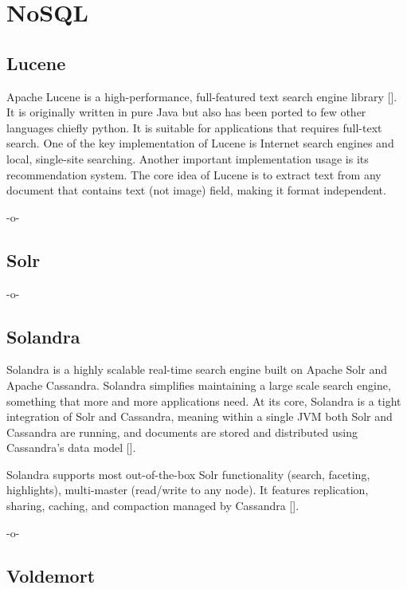 \section{NoSQL}
\label{S:o-NoSQL}

\subsection{Lucene}

Apache Lucene is a high-performance, full-featured text search engine
library [\cite{www-lucene}].  It is originally written in pure Java but
also has been ported to few other languages chiefly python.  It is
suitable for applications that requires full-text search.  One of the
key implementation of Lucene is Internet search engines and local,
single-site searching.  Another important implementation usage is its
recommendation system. The core idea of Lucene is to extract text from
any document that contains text (not image) field, making it format
independent.

     -o-

\subsection{Solr}

-o-

\subsection{Solandra}
     
Solandra is a highly scalable real-time search engine built on Apache
Solr and Apache Cassandra. Solandra simplifies maintaining a large
scale search engine, something that more and more applications
need. At its core, Solandra is a tight integration of Solr and
Cassandra, meaning within a single JVM both Solr and Cassandra are
running, and documents are stored and distributed using Cassandra's
data model [\cite{github-solandra}].

Solandra supports most out-of-the-box Solr functionality (search,
faceting, highlights), multi-master (read/write to any node). It
features replication, sharing, caching, and compaction managed by
Cassandra [\cite{github-solandra2}].

     -o-
    
\subsection{Voldemort}

